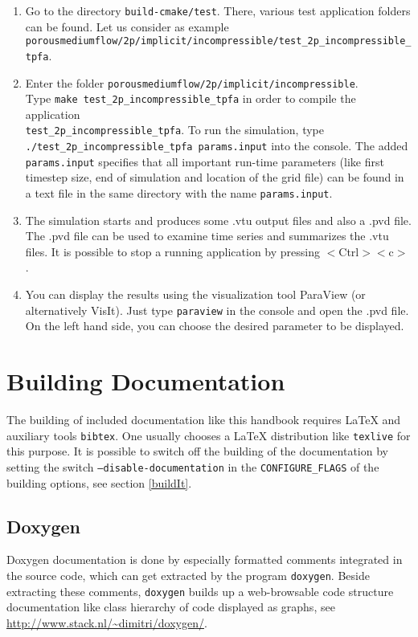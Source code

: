 \begin{enumerate}
\item Go to the directory \texttt{build-cmake/test}. There, various test application
      folders can be found. Let us consider as example\\
      \texttt{porousmediumflow/2p/implicit/incompressible/test{\_}2p{\_}incompressible{\_}tpfa}.
\item Enter the folder \texttt{porousmediumflow/2p/implicit/incompressible}.\\ Type \texttt{make test{\_}2p{\_}incompressible{\_}tpfa}
      in order to compile the application\\ \texttt{test{\_}2p{\_}incompressible{\_}tpfa}. To run the simulation,
      type \texttt{./test{\_}2p{\_}incompressible{\_}tpfa params.input}
      into the console.
      The added \texttt{params.input} specifies that all
      important run-time parameters (like first timestep size, end of simulation and location
      of the grid file) can be found in a text file in the same directory  with the
      name \texttt{params.input}.
\item The simulation starts and produces some .vtu output files and also a .pvd
      file. The .pvd file can be used to examine time series and summarizes the .vtu
      files. It is possible to stop a running application by pressing $<$Ctrl$><$c$>$.
\item You can display the results using the visualization tool ParaView (or
      alternatively VisIt). Just type \texttt{paraview} in the console and open the
      .pvd file. On the left hand side, you can choose the desired parameter to be displayed.
\end{enumerate}

\section{Building Documentation}

The building of included documentation like this handbook requires \LaTeX{} and auxiliary tools
\texttt{bibtex}. One usually chooses a \LaTeX{} distribution like \texttt{texlive} for this purpose.
It is possible to switch off the building of the documentation by setting the switch \texttt{--disable-documentation}
in the \texttt{CONFIGURE\_FLAGS} of the building options, see section \ref{buildIt}.

\subsection{Doxygen}
\label{sec:build-doxy-doc}
Doxygen documentation is done by especially formatted comments integrated in the source code,
which can get extracted by the program \texttt{doxygen}. Beside extracting these comments,
\texttt{doxygen} builds up a web-browsable code structure documentation
like class hierarchy of code displayed as graphs, see \url{http://www.stack.nl/~dimitri/doxygen/}.

